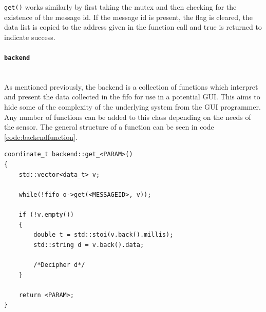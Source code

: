 \texttt{get()} works similarly by first taking the mutex and then checking for the existence of the message id.
If the message id is present, the flag is cleared, the data list is copied to the address given in the function call and true is returned to indicate success.

\paragraph*{\texttt{backend}}~\\
As mentioned previously, the backend is a collection of functions which interpret and present the data collected in the fifo for use in a potential GUI.
This aims to hide some of the complexity of the underlying system from the GUI programmer.
Any number of functions can be added to this class depending on the needs of the sensor.
The general structure of a function can be seen in code \ref{code:backendfunction}.

\begin{lstlisting}[caption=Function template for accesing data in fifo,label=code:backendfunction]
coordinate_t backend::get_<PARAM>()
{
	std::vector<data_t> v;

	while(!fifo_o->get(<MESSAGEID>, v));

	if (!v.empty())
	{
		double t = std::stoi(v.back().millis);
		std::string d = v.back().data;

		/*Decipher d*/
	}

	return <PARAM>;
}
\end{lstlisting}